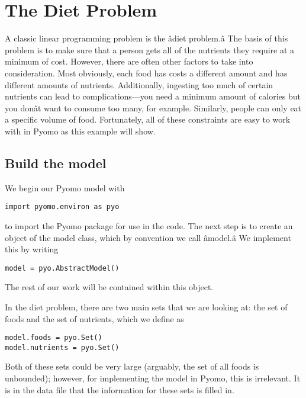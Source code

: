 \documentclass{article}
\begin{document}
\section*{The Diet Problem}

\hspace*{5mm}A classic linear programming problem is the âdiet problem.â The basis of this problem is to make sure that a person gets all of the nutrients they require at a minimum of cost.  However, there are often other factors to take into consideration.  Most obviously, each food has costs a different amount and has different amounts of nutrients.  Additionally, ingesting too much of certain nutrients can lead to complications---you need a minimum amount of calories but you donât want to consume too many, for example.  Similarly, people can only eat a specific volume of food.  Fortunately, all of these constraints are easy to work with in Pyomo as this example will show.

\subsection*{Build the model}

\hspace*{5mm}We begin our Pyomo model with

\begin{verbatim}
import pyomo.environ as pyo
\end{verbatim}

\noindent
to import the Pyomo package for use in the code.  The next step is to create an object of the model class, which by convention we call âmodel.â  We implement this by writing

\begin{verbatim}model = pyo.AbstractModel() \end{verbatim}

\noindent
The rest of our work will be contained within this object.

In the diet problem, there are two main sets that we are looking at: the set of foods and the set of nutrients, which we define as

\begin{verbatim}model.foods = pyo.Set()
model.nutrients = pyo.Set()\end{verbatim}

Both of these sets could be very large (arguably, the set of all foods is unbounded); however, for implementing the model in Pyomo, this is irrelevant.  It is in the data file that the information for these sets is filled in.
\end{document}

